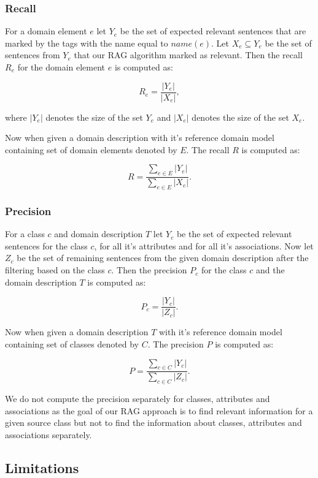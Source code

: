 \subsubsection{Recall}

For a domain element $e$ let $Y_e$ be the set of expected relevant sentences that are marked by the tags with the name equal to $name(e)$. Let $X_e \subseteq Y_e$ be the set of sentences from $Y_e$ that our RAG algorithm marked as relevant. Then the recall $R_e$ for the domain element $e$ is computed as:

\[ R_e = \dfrac{|Y_e|}{|X_e|}, \]

\noindent{}where $|Y_e|$ denotes the size of the set $Y_e$ and $|X_e|$ denotes the size of the set $X_e$.

Now when given a domain description with it's reference domain model containing set of domain elements denoted by $E$. The recall $R$ is computed as:

\[ R = \dfrac{\sum_{e \in E}|Y_e|}{\sum_{e \in E}|X_e|}. \]


\subsubsection{Precision}

For a class $c$ and domain description $T$ let $Y_{c}$ be the set of expected relevant sentences for the class $c$, for all it's attributes and for all it's associations. Now let $Z_{c}$ be the set of remaining sentences from the given domain description after the filtering based on the class $c$. Then the precision $P_{c}$ for the class $c$ and the domain description $T$ is computed as:

\[ P_c = \dfrac{|Y_{c}|}{|Z_c|}. \]

Now when given a domain description $T$ with it's reference domain model containing set of classes denoted by $C$. The precision $P$ is computed as:

\[ P = \dfrac{\sum_{c \in C}|Y_c|}{\sum_{c \in C}|Z_c|}. \]

We do not compute the precision separately for classes, attributes and associations as the goal of our RAG approach is to find relevant information for a given source class but not to find the information about classes, attributes and associations separately.


\subsection{Limitations}

